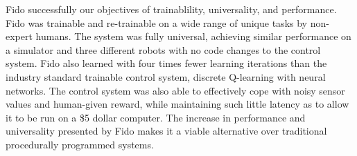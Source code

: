 Fido successfully our objectives of trainablility, universality, and performance.
Fido was trainable and re-trainable on a wide range of unique tasks by non-expert humans.
The system was fully universal, achieving similar performance on a simulator and three different robots with no code changes to the control system.
Fido also learned with four times fewer learning iterations than the industry standard trainable control system, discrete Q-learning with neural networks.
The control system was also able to effectively cope with noisy sensor values and human-given reward, while maintaining such little latency as to allow it to be run on a \$5 dollar computer.
The increase in performance and universality presented by Fido makes it a viable alternative over traditional procedurally programmed systems.
